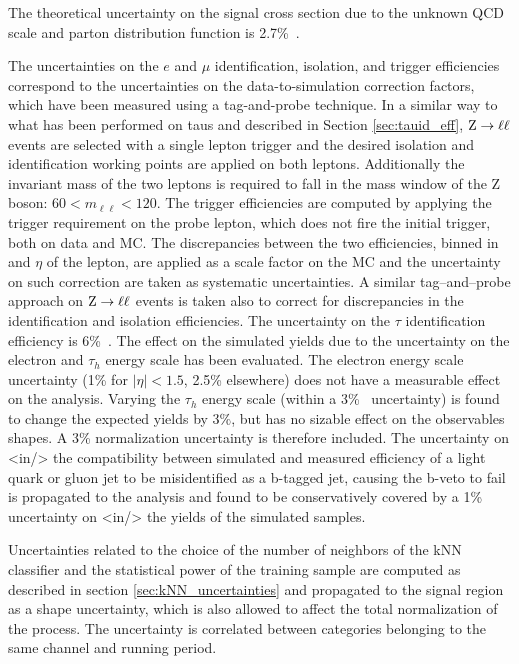 The theoretical uncertainty on the signal cross section due to the unknown QCD scale and parton distribution function is 2.7\%~\cite{LHCHiggsCrossSectionWorkingGroup:2011ti}.

The uncertainties on the $e$ and $\mu$ identification, isolation, and trigger efficiencies correspond to the uncertainties on the data-to-simulation correction factors, which have been measured using a tag-and-probe technique. In a similar way to what has been performed on taus and described in Section \ref{sec:tauid_eff}, $\mathrm{Z} \rightarrow \ell \ell$ events are selected with a single lepton trigger and the desired isolation and identification working points are applied on both leptons. Additionally the invariant mass of the two leptons is required to fall in the mass window of the Z boson: $60 < m_{\ell\ell} < 120$. The trigger efficiencies are computed by applying the trigger requirement on the probe lepton, which does not fire the initial trigger, both on data and MC. The discrepancies between the two efficiencies, binned in \pT and $\eta$ of the lepton, are applied as a scale factor on the MC and the uncertainty on such correction are taken as systematic uncertainties. A similar tag--and--probe approach on $\mathrm{Z} \rightarrow \ell \ell$ events is taken also to correct for discrepancies in the identification and isolation efficiencies.
The uncertainty on the $\tau$ identification efficiency is 6\%~\cite{CMS-PAS-TAU-11-001}.
The effect on the simulated yields due to the uncertainty on the electron and $\tau_h$ energy scale has been evaluated.
The electron energy scale uncertainty (1\% for $|\eta| < 1.5$, 2.5\% elsewhere) does not have a measurable effect on the analysis.
Varying the $\tau_h$ energy scale (within a 3\%~\cite{H_tautau} uncertainty) is found to change the expected yields by $3\%$, but has no sizable effect on the observables shapes. A 3\% normalization uncertainty is therefore included.
The uncertainty on <in/> the compatibility between simulated and measured efficiency of a light quark or gluon jet to be misidentified as a b-tagged jet, causing the b-veto to 
fail is propagated to the analysis and found to be conservatively covered by a 1\% uncertainty on <in/> the yields of the simulated samples.

Uncertainties related to the choice of the number of neighbors of the kNN classifier and the statistical power of the training sample are computed as described in section \ref{sec:kNN_uncertainties} and propagated to the signal region as a shape uncertainty, which is also allowed to affect the total normalization of the process. The uncertainty is correlated between categories belonging to the same channel and running period.

